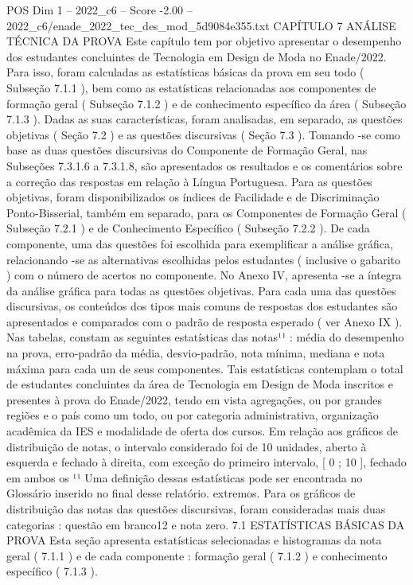 \begin{textsample}{POS Dim 1 – 2022\_c6 – Score -2.00 – 2022\_c6/enade\_2022\_tec\_des\_mod\_5d9084e355.txt}  \label{ex:f1_pos_266}
CAPÍTULO 7 ANÁLISE TÉCNICA DA PROVA Este capítulo tem por objetivo apresentar o desempenho dos estudantes concluintes de Tecnologia em Design de Moda no Enade/2022.
Para isso, foram calculadas as estatísticas básicas da prova em seu todo ( Subseção 7.1.1 ), bem como as estatísticas relacionadas aos componentes de formação geral ( Subseção 7.1.2 ) e de conhecimento específico da área ( Subseção 7.1.3 ).
Dadas as suas características, foram analisadas, em separado, as questões objetivas ( Seção 7.2 ) e as questões discursivas ( Seção 7.3 ).
Tomando -se como base as duas questões discursivas do Componente de Formação Geral, nas Subseções 7.3.1.6 a 7.3.1.8, são apresentados os resultados e os comentários sobre a correção das respostas em relação à Língua Portuguesa.
Para as questões objetivas, foram disponibilizados os índices de Facilidade e de Discriminação Ponto-Bisserial, também em separado, para os Componentes de Formação Geral ( Subseção 7.2.1 ) e de Conhecimento Específico ( Subseção 7.2.2 ).
De cada componente, uma das questões foi escolhida para exemplificar a análise gráfica, relacionando -se as alternativas escolhidas pelos estudantes ( inclusive o gabarito ) com o número de acertos no componente.
No Anexo IV, apresenta -se a íntegra da análise gráfica para todas as questões objetivas.
Para cada uma das questões discursivas, os conteúdos dos tipos mais comuns de respostas dos estudantes são apresentados e comparados com o padrão de resposta esperado ( ver Anexo IX ).
Nas tabelas, constam as seguintes estatísticas das notas¹¹ : média do desempenho na prova, erro-padrão da média, desvio-padrão, nota mínima, mediana e nota máxima para cada um de seus componentes.
Tais estatísticas contemplam o total de estudantes concluintes da área de Tecnologia em Design de Moda inscritos e presentes à prova do Enade/2022, tendo em vista agregações, ou por grandes regiões e o país como um todo, ou por categoria administrativa, organização acadêmica da IES e modalidade de oferta dos cursos.
Em relação aos gráficos de distribuição de notas, o intervalo considerado foi de 10 unidades, aberto à esquerda e fechado à direita, com exceção do primeiro intervalo, [ 0 ; 10 ], fechado em ambos os ¹¹ Uma definição dessas estatísticas pode ser encontrada no Glossário inserido no final desse relatório. extremos.
Para os gráficos de distribuição das notas das questões discursivas, foram consideradas mais duas categorias : questão em branco12 e nota zero. 7.1 ESTATÍSTICAS BÁSICAS DA PROVA Esta seção apresenta estatísticas selecionadas e histogramas da nota geral ( 7.1.1 ) e de cada componente : formação geral ( 7.1.2 ) e conhecimento específico ( 7.1.3 ).

\end{textsample}
